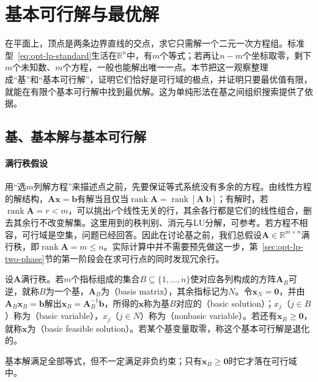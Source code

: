 \section{基本可行解与最优解}
\label{sec:opt-lp-basic-solutions}

在平面上，顶点是两条边界直线的交点，求它只需解一个二元一次方程组。标准型~\eqref{eq:opt-lp-standard}生活在$\mathbb R^n$中，有$m$个等式；若再让$n-m$个坐标取零，剩下$m$个未知数、$m$个方程，一般也能解出唯一一点。本节把这一观察整理成“基”和“基本可行解”，证明它们恰好是可行域的极点，并证明只要最优值有限，就能在有限个基本可行解中找到最优解。这为单纯形法在基之间组织搜索提供了依据。

\subsection{基、基本解与基本可行解}
\label{sec:opt-lp-bases}

\paragraph{满行秩假设}
用“选$m$列解方程”来描述点之前，先要保证等式系统没有多余的方程。由线性方程的解结构，$\bm A\bm x=\bm b$有解当且仅当$\operatorname{rank}\bm A=\operatorname{rank}[\bm A\ \bm b]$；有解时，若$\operatorname{rank}\bm A=r<m$，可以挑出$r$个线性无关的行，其余各行都是它们的线性组合，删去其余行不改变解集。这里用到的秩判别、消元与LU分解，可参考。若方程不相容，可行域是空集，问题已经回答。因此在讨论基之前，我们总假设$\bm A\in\mathbb R^{m\times n}$满行秩，即$\operatorname{rank}\bm A=m\le n$。实际计算中并不需要预先做这一步，第~\ref{sec:opt-lp-two-phase}节的第一阶段会在求可行点的同时发现冗余行。

\begin{definition}[基与基本可行解]
\label{def:opt-lp-basic-feasible}
设$\bm A$满行秩。若$m$个指标组成的集合$B\subseteq\{1,\dots,n\}$使对应各列构成的方阵$\bm A_B$可逆，就称$B$为一个基，$\bm A_B$为（basis matrix），其余指标记为$N$。令$\bm x_N=\bm 0$，并由$\bm A_B\bm x_B=\bm b$解出$\bm x_B=\bm A_B^{-1}\bm b$，所得的$\bm x$称为基$B$对应的（basic solution）；$x_j$（$j\in B$）称为（basic variable），$x_j$（$j\in N$）称为（nonbasic variable）。若还有$\bm x_B\ge\bm 0$，就称$\bm x$为（basic feasible solution）。若某个基变量取零，称这个基本可行解是退化的。
\end{definition}

基本解满足全部等式，但不一定满足非负约束；只有$\bm x_B\ge\bm 0$时它才落在可行域中。

